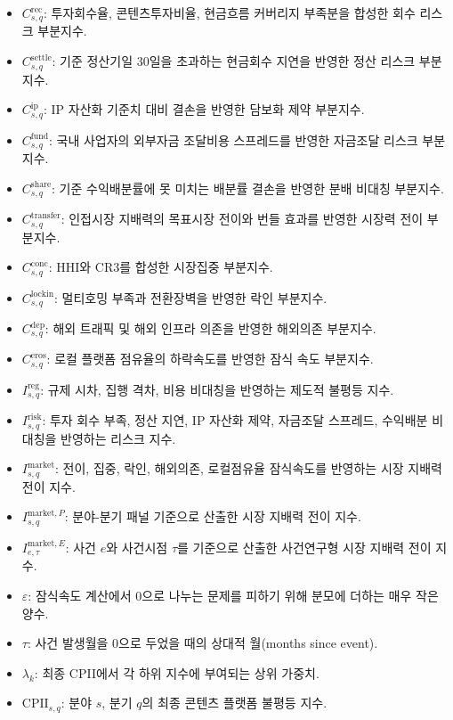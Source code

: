 \documentclass[11pt,a4paper]{report}
\newenvironment{summarylist}{\begin{itemize}[leftmargin=1.8em,itemsep=0.35em,topsep=0.35em]\RaggedRight}{\end{itemize}}
\begin{document}
\begin{summarylist}
  \item \textbf{$C^{\mathrm{rec}}_{s,q}$}: 투자회수율, 콘텐츠투자비율, 현금흐름 커버리지 부족분을 합성한 회수 리스크 부분지수.
  \item \textbf{$C^{\mathrm{settle}}_{s,q}$}: 기준 정산기일 30일을 초과하는 현금회수 지연을 반영한 정산 리스크 부분지수.
  \item \textbf{$C^{\mathrm{ip}}_{s,q}$}: IP 자산화 기준치 대비 결손을 반영한 담보화 제약 부분지수.
  \item \textbf{$C^{\mathrm{fund}}_{s,q}$}: 국내 사업자의 외부자금 조달비용 스프레드를 반영한 자금조달 리스크 부분지수.
  \item \textbf{$C^{\mathrm{share}}_{s,q}$}: 기준 수익배분률에 못 미치는 배분률 결손을 반영한 분배 비대칭 부분지수.
  \item \textbf{$C^{\mathrm{transfer}}_{s,q}$}: 인접시장 지배력의 목표시장 전이와 번들 효과를 반영한 시장력 전이 부분지수.
  \item \textbf{$C^{\mathrm{conc}}_{s,q}$}: HHI와 CR3를 합성한 시장집중 부분지수.
  \item \textbf{$C^{\mathrm{lockin}}_{s,q}$}: 멀티호밍 부족과 전환장벽을 반영한 락인 부분지수.
  \item \textbf{$C^{\mathrm{dep}}_{s,q}$}: 해외 트래픽 및 해외 인프라 의존을 반영한 해외의존 부분지수.
  \item \textbf{$C^{\mathrm{eros}}_{s,q}$}: 로컬 플랫폼 점유율의 하락속도를 반영한 잠식 속도 부분지수.
  \item \textbf{$I^{\mathrm{reg}}_{s,q}$}: 규제 시차, 집행 격차, 비용 비대칭을 반영하는 제도적 불평등 지수.
  \item \textbf{$I^{\mathrm{risk}}_{s,q}$}: 투자 회수 부족, 정산 지연, IP 자산화 제약, 자금조달 스프레드, 수익배분 비대칭을 반영하는 리스크 지수.
  \item \textbf{$I^{\mathrm{market}}_{s,q}$}: 전이, 집중, 락인, 해외의존, 로컬점유율 잠식속도를 반영하는 시장 지배력 전이 지수.
  \item \textbf{$I^{\mathrm{market},P}_{s,q}$}: 분야-분기 패널 기준으로 산출한 시장 지배력 전이 지수.
  \item \textbf{$I^{\mathrm{market},E}_{e,\tau}$}: 사건 $e$와 사건시점 $\tau$를 기준으로 산출한 사건연구형 시장 지배력 전이 지수.
  \item \textbf{$\varepsilon$}: 잠식속도 계산에서 0으로 나누는 문제를 피하기 위해 분모에 더하는 매우 작은 양수.
  \item \textbf{$\tau$}: 사건 발생월을 0으로 두었을 때의 상대적 월(months since event).
  \item \textbf{$\lambda_k$}: 최종 CPII에서 각 하위 지수에 부여되는 상위 가중치.
  \item \textbf{$\mathrm{CPII}_{s,q}$}: 분야 $s$, 분기 $q$의 최종 콘텐츠 플랫폼 불평등 지수.
\end{summarylist}
\endgroup
\end{document}
